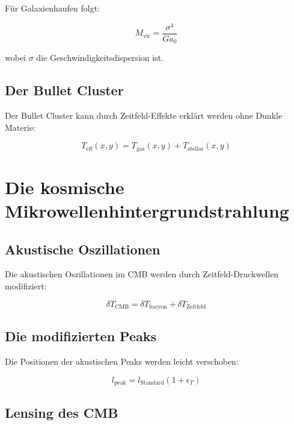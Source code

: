 \documentclass[12pt,a4paper]{report}
\begin{document}
	Für Galaxienhaufen folgt:
	
	\begin{equation}
		M_{\text{vir}} = \frac{\sigma^4}{Ga_0}
	\end{equation}
	
	wobei $\sigma$ die Geschwindigkeitsdispersion ist.
	
	\subsection{Der Bullet Cluster}
	
	Der Bullet Cluster kann durch Zeitfeld-Effekte erklärt werden ohne Dunkle Materie:
	
	\begin{equation}
		T_{\text{eff}}(x,y) = T_{\text{gas}}(x,y) + T_{\text{stellar}}(x,y)
	\end{equation}
	
	\section{Die kosmische Mikrowellenhintergrundstrahlung}
	
	\subsection{Akustische Oszillationen}
	
	Die akustischen Oszillationen im CMB werden durch Zeitfeld-Druckwellen modifiziert:
	
	\begin{equation}
		\delta T_{\text{CMB}} = \delta T_{\text{baryon}} + \delta T_{\text{Zeitfeld}}
	\end{equation}
	
	\subsection{Die modifizierten Peaks}
	
	Die Positionen der akustischen Peaks werden leicht verschoben:
	
	\begin{equation}
		l_{\text{peak}} = l_{\text{Standard}} \left(1 + \epsilon_T\right)
	\end{equation}
	
	\subsection{Lensing des CMB}
	
\end{document}
